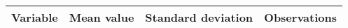 \begin{tabular}{lrrr}
  \toprule
Variable & Mean value & Standard deviation & Observations \\ 
  \midrule
 \bottomrule
\end{tabular}
